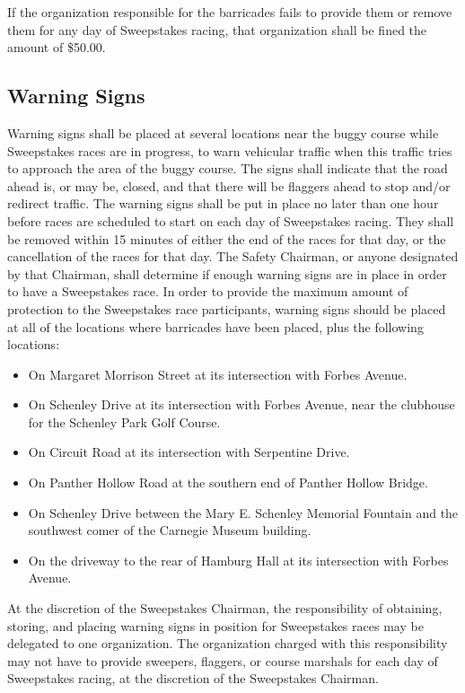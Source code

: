 \documentclass[openany]{book}
\begin{document}
If the organization responsible for the barricades fails to provide them or remove them for any day of Sweepstakes racing, that organization shall be fined the amount of \$50.00.

\subsection{Warning Signs}

Warning signs shall be placed at several locations near the buggy course while Sweepstakes races are in progress, to warn vehicular traffic when this traffic tries to approach the area of the buggy course. The signs shall indicate that the road ahead is, or may be, closed, and that there will be flaggers ahead to stop and/or redirect traffic. The warning signs shall be put in place no later than one hour before races are scheduled to start on each day of Sweepstakes racing. They shall be removed within 15 minutes of either the end of the races for that day, or the cancellation of the races for that day. The Safety Chairman, or anyone designated by that Chairman, shall determine if enough warning signs are in place in order to have a Sweepstakes race. In order to provide the maximum amount of protection to the Sweepstakes race participants, warning signs should be placed at all of the locations where barricades have been placed, plus the following locations:
\begin{itemize}
	\item On Margaret Morrison Street at its intersection with Forbes Avenue.
	\item On Schenley Drive at its intersection with Forbes Avenue, near the clubhouse for the Schenley Park Golf Course.
	\item On Circuit Road at its intersection with Serpentine Drive.
	\item On Panther Hollow Road at the southern end of Panther Hollow Bridge.
	\item On Schenley Drive between the Mary E. Schenley Memorial Fountain and the southwest comer of the Carnegie Museum building.
	\item On the driveway to the rear of Hamburg Hall at its intersection with Forbes Avenue.
\end{itemize}

At the discretion of the Sweepstakes Chairman, the responsibility of obtaining, storing, and placing warning signs in position for Sweepstakes races may be delegated to one organization. The organization charged with this responsibility may not have to provide sweepers, flaggers, or course marshals for each day of Sweepstakes racing, at the discretion of the Sweepstakes Chairman.
\end{document}
